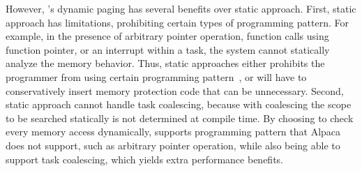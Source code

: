 However, \sys's dynamic paging has several benefits over static approach.
First, static approach has limitations, prohibiting certain types of programming pattern. For example,
in the presence of arbitrary pointer operation, function calls using function pointer, or an interrupt
within a task, the system cannot statically analyze the memory behavior. Thus, static
approaches either prohibits the programmer from using certain programming pattern~\cite{alpaca}, 
or will have to conservatively insert memory protection code that can be unnecessary.
Second, static approach cannot handle task coalescing, because with coalescing the scope to be
searched statically is not determined at compile time. 
By choosing to check every memory access dynamically, \sys supports programming pattern that
Alpaca does not support, such as arbitrary pointer operation, while also being able to
support task coalescing, which yields extra performance benefits.
%


%
%
%
%
%
%
